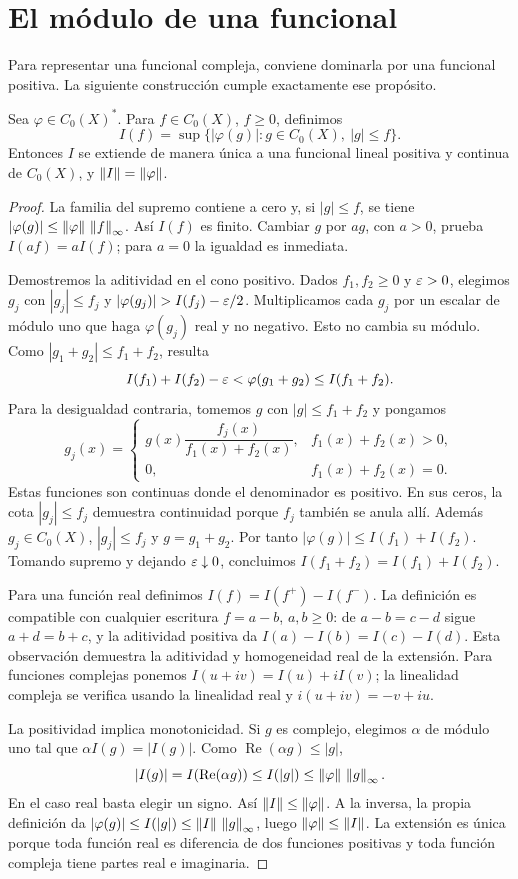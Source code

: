 \section{El módulo de una funcional}
Para representar una funcional compleja, conviene dominarla por una funcional positiva. La siguiente construcción cumple exactamente ese propósito.
\begin{lema}\label{v2:modulo-funcional}
Sea $\varphi\in C_0(X)^*$. Para $f\in C_0(X)$, $f\ge0$, definimos
\[
 I(f)=\sup\{|\varphi(g)|:g\in C_0(X),\ |g|\le f\}.
\]
Entonces $I$ se extiende de manera única a una funcional lineal positiva y continua de $C_0(X)$, y $\left\lVert I\right\rVert=\left\lVert\varphi\right\rVert$.
\end{lema}
\begin{proof}
La familia del supremo contiene a cero y, si $|g|\le f$, se tiene $|\varphi(g)|\le\left\lVert\varphi\right\rVert\,\left\lVert f\right\rVert_\infty$. Así $I(f)$ es finito. Cambiar $g$ por $ag$, con $a>0$, prueba $I(af)=aI(f)$; para $a=0$ la igualdad es inmediata.

Demostremos la aditividad en el cono positivo. Dados $f_1,f_2\ge0$ y $\varepsilon>0$, elegimos $g_j$ con $|g_j|\le f_j$ y $|\varphi(g_j)|>I(f_j)-\eps/2$. Multiplicamos cada $g_j$ por un escalar de módulo uno que haga $\varphi(g_j)$ real y no negativo. Esto no cambia su módulo. Como $|g_1+g_2|\le f_1+f_2$, resulta
\[
 I(f_1)+I(f_2)-\varepsilon<\varphi(g_1+g_2)\le I(f_1+f_2).
\]
Para la desigualdad contraria, tomemos $g$ con $|g|\le f_1+f_2$ y pongamos
\[
 g_j(x)=\begin{cases}
 g(x)\dfrac{f_j(x)}{f_1(x)+f_2(x)},&f_1(x)+f_2(x)>0,\\[4pt]
 0,&f_1(x)+f_2(x)=0.
 \end{cases}
\]
Estas funciones son continuas donde el denominador es positivo. En sus ceros, la cota $|g_j|\le f_j$ demuestra continuidad porque $f_j$ también se anula allí. Además $g_j\in C_0(X)$, $|g_j|\le f_j$ y $g=g_1+g_2$. Por tanto $|\varphi(g)|\le I(f_1)+I(f_2)$. Tomando supremo y dejando $\varepsilon\downarrow0$, concluimos $I(f_1+f_2)=I(f_1)+I(f_2)$.

Para una función real definimos $I(f)=I(f^+)-I(f^-)$. La definición es compatible con cualquier escritura $f=a-b$, $a,b\ge0$: de $a-b=c-d$ sigue $a+d=b+c$, y la aditividad positiva da $I(a)-I(b)=I(c)-I(d)$. Esta observación demuestra la aditividad y homogeneidad real de la extensión. Para funciones complejas ponemos $I(u+iv)=I(u)+iI(v)$; la linealidad compleja se verifica usando la linealidad real y $i(u+iv)=-v+iu$.

La positividad implica monotonicidad. Si $g$ es complejo, elegimos $\alpha$ de módulo uno tal que $\alpha I(g)=|I(g)|$. Como $\operatorname{Re}(\alpha g)\le|g|$,
\[
 |I(g)|=I(\operatorname{Re}(\alpha g))\le I(|g|)
 \le\left\lVert\varphi\right\rVert\,\left\lVert g\right\rVert_\infty.
\]
En el caso real basta elegir un signo. Así $\left\lVert I\right\rVert\le\left\lVert\varphi\right\rVert$. A la inversa, la propia definición da $|\varphi(g)|\le I(|g|)\le\left\lVert I\right\rVert\,\left\lVert g\right\rVert_\infty$, luego $\left\lVert\varphi\right\rVert\le\left\lVert I\right\rVert$. La extensión es única porque toda función real es diferencia de dos funciones positivas y toda función compleja tiene partes real e imaginaria.
\end{proof}

